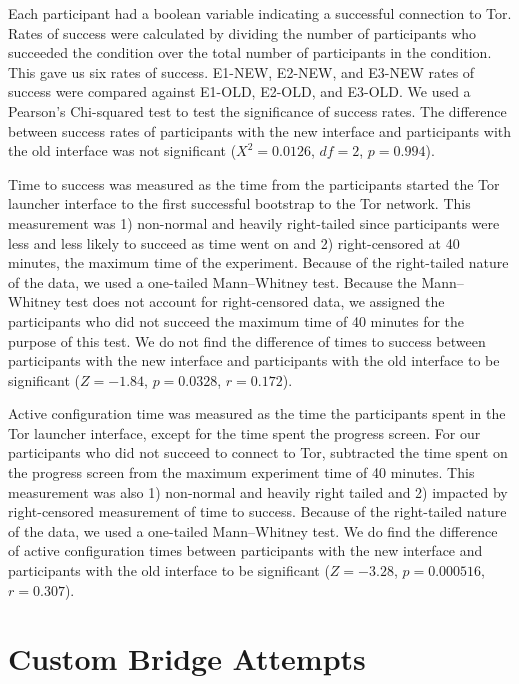 \documentclass[USenglish,oneside,twocolumn]{article}
\begin{document}
Each participant had a boolean variable indicating a successful connection to Tor. Rates of success were calculated by dividing the number of participants who succeeded the condition over the total number of participants in the condition. This gave us six rates of success. E1-NEW, E2-NEW, and E3-NEW rates of success were compared against E1-OLD, E2-OLD, and E3-OLD.  We used a Pearson's Chi-squared test to test the significance of success rates. The difference between success rates of participants with the new interface and participants with the old interface was not significant ($X^2 = 0.0126$, $df = 2$, $p = 0.994$).

Time to success was measured as the time from the participants started the Tor launcher interface to the first successful bootstrap to the Tor network. This measurement was 1) non-normal and heavily right-tailed since participants were less and less likely to succeed as time went on and 2) right-censored at 40 minutes, the maximum time of the experiment. Because of the right-tailed nature of the data, we used a one-tailed Mann--Whitney test. Because the Mann--Whitney test does not account for right-censored data, we assigned the participants who did not succeed the maximum time of 40 minutes for the purpose of this test. We do not find the difference of times to success between participants with the new interface and participants with the old interface to be significant ($ Z = -1.84$, $p = 0.0328$, $r= 0.172$). 

Active configuration time was measured as the time the participants spent in the Tor launcher interface, except for the time spent the progress screen. For our participants who did not succeed to connect to Tor, subtracted the time spent on the progress screen from the maximum experiment time of 40 minutes. This measurement was also 1) non-normal and heavily right tailed and 2) impacted by right-censored measurement of time to success. Because of the right-tailed nature of the data, we used a one-tailed Mann--Whitney test. We do find the difference of active configuration times between participants with the new interface and participants with the old interface to be significant ($Z = -3.28$, $p = 0.000516$, $r = 0.307$).

\section{Custom Bridge Attempts} 
\label{custom}
\end{document}
